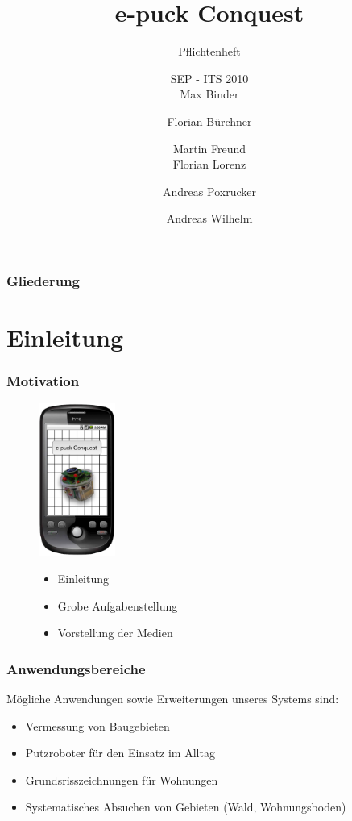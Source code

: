 \documentclass{beamer}
\title[Pflichtenheft] %
{e-puck Conquest}
\subtitle
{Pflichtenheft}
\author[Autor, Anders] %
{SEP - ITS 2010 \\ Max Binder \and Florian Bürchner \and Martin Freund
	\\ Florian Lorenz \and Andreas Poxrucker \and Andreas Wilhelm}
\institute[Universität Passau] %
{
  Fakultät für Informatik und Mathematik\\
  Universität Passau}
\begin{document}
\begin{frame}
  \titlepage
\end{frame}

\begin{frame}
  \frametitle{Gliederung}
  \tableofcontents
\end{frame}

\section{Einleitung}

\begin{frame}
  \frametitle{Motivation}
  \begin{figure}[htbp]
	\begin{minipage}[t]{5cm}
		\vspace{0pt}
		\includegraphics[height=5cm]{logo.eps} 
	\end{minipage}
	\hfill
	\begin{minipage}[t]{0.5\textwidth}
		\vspace{30pt}
		\begin{itemize}
			\item Einleitung
			\item Grobe Aufgabenstellung
			\item Vorstellung der Medien
		\end{itemize}
	\end{minipage}
   \end{figure}
\end{frame}

\begin{frame}
  \frametitle{Anwendungsbereiche}

Mögliche Anwendungen sowie Erweiterungen unseres Systems sind:

	\begin{itemize}
	    \item Vermessung von Baugebieten
        \item Putzroboter für den Einsatz im Alltag
		\item Grundsrisszeichnungen für Wohnungen
		\item Systematisches Absuchen von Gebieten (Wald, Wohnungsboden)	
	\end{itemize}

\end{frame}
\end{document}
